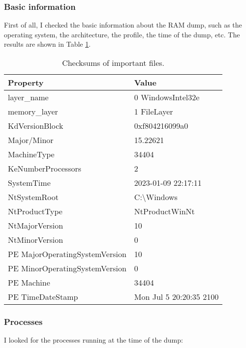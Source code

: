 \documentclass[12pt]{article}
\begin{document}
\subsubsection{Basic information}

First of all, I checked the basic information about the RAM dump, such as the operating system, the architecture, the profile, the time of the dump, etc. The results are shown in Table \ref{table:info}.

\begin{table}[!ht]
        \centering
        \begin{tabular}{ll}
        \toprule
        \textbf{Property} & \textbf{Value} \\
        \midrule
        layer\_name & 0 WindowsIntel32e \\
        memory\_layer & 1 FileLayer \\
        KdVersionBlock & 0xf804216099a0 \\
        Major/Minor & 15.22621 \\
        MachineType & 34404 \\
        KeNumberProcessors & 2 \\
        SystemTime & 2023-01-09 22:17:11 \\
        NtSystemRoot & C:\textbackslash Windows \\
        NtProductType & NtProductWinNt \\
        NtMajorVersion & 10 \\
        NtMinorVersion & 0 \\
        PE MajorOperatingSystemVersion & 10 \\
        PE MinorOperatingSystemVersion & 0 \\
        PE Machine & 34404 \\
        PE TimeDateStamp & Mon Jul  5 20:20:35 2100 \\
        \bottomrule
        \end{tabular}
        \caption{Checksums of important files.}
        \label{table:info}
\end{table}

\subsubsection{Processes}

I looked for the processes running at the time of the dump:
\end{document}
